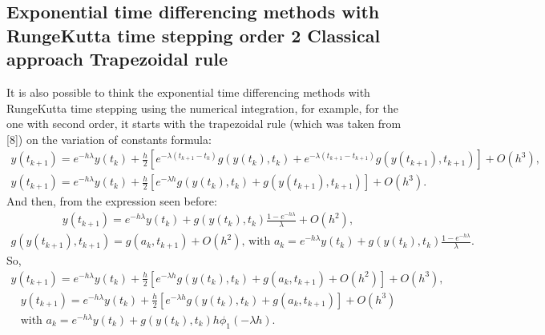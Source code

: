 \documentclass[letterpaper,10pt,english]{jupyterBook}
\begin{document}
\subsection{Exponential time differencing methods with Runge\sphinxhyphen{}Kutta time stepping \sphinxhyphen{} order 2 \sphinxhyphen{} Classical approach \sphinxhyphen{} Trapezoidal rule}
\label{\detokenize{appendix:exponential-time-differencing-methods-with-runge-kutta-time-stepping-order-2-classical-approach-trapezoidal-rule}}
\sphinxAtStartPar
It is also possible to think the exponential time differencing methods with Runge\sphinxhyphen{}Kutta time stepping using the numerical integration, for example, for the one with second order, it starts with the trapezoidal rule (which was taken from {[}8{]}) on the variation of constants formula:
\begin{equation*}
\begin{split}
y(t_{k+1}) = e^{-h \lambda}y(t_k) + \frac{h}{2} \left[ e^{-\lambda(t_{k+1}-t_k)} g(y(t_k), t_k) + e^{-\lambda(t_{k+1}-t_{k+1})} g(y(t_{k+1}), t_{k+1}) \right] + O(h^3), \\
    y(t_{k+1}) = e^{-h \lambda}y(t_k) + \frac{h}{2} \left[ e^{-\lambda h} g(y(t_k), t_k) + g(y(t_{k+1}), t_{k+1}) \right] +  O(h^3).
\end{split}
\end{equation*}
\sphinxAtStartPar
And then, from the expression seen before:
\begin{equation*}
\begin{split}
y(t_{k+1}) = e^{-h \lambda}y(t_k) + g(y(t_k), t_k) \frac{1-e^{-h \lambda}}{\lambda} + O(h^2),
\end{split}
\end{equation*}\begin{equation*}
\begin{split}
    g(y(t_{k+1}), t_{k+1}) = g(a_k, t_{k+1}) + O(h^2) \text{, with } a_k = e^{-h \lambda}y(t_k) + g(y(t_k), t_k) \frac{1-e^{-h\lambda}}{\lambda}.
\end{split}
\end{equation*}
\sphinxAtStartPar
So,
\begin{equation*}
\begin{split}
y(t_{k+1}) = e^{-h \lambda}y(t_k) + \frac{h}{2} \left[ e^{-\lambda h} g(y(t_k), t_k) + g(a_k, t_{k+1}) + O(h^2) \right] +  O(h^3),
\end{split}
\end{equation*}\begin{equation*}
\begin{split}
y(t_{k+1}) = e^{-h \lambda}y(t_k) + \frac{h}{2} \left[ e^{-\lambda h} g(y(t_k), t_k) + g(a_k, t_{k+1}) \right] +  O(h^3) \\
    \text{with } a_k = e^{-h \lambda}y(t_k) + g(y(t_k), t_k) h \phi_1 (-\lambda h).
\end{split}
\end{equation*}
\end{document}
